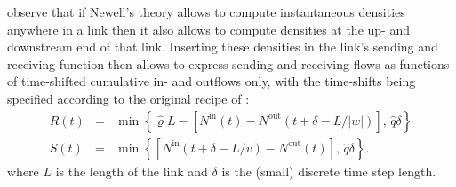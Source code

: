 \citet{yperman-2006,yperman-phd} observe that if Newell's theory
allows to compute instantaneous densities anywhere in a link then
it also allows to compute densities at the up- and downstream end
of that link. Inserting these densities in the link's sending and
receiving function then allows to express sending and receiving flows
as functions of time-shifted cumulative in- and outflows only, with
the time-shifts being specified according to the original recipe of
\citet{newell-1993}:
\begin{eqnarray}
R(t) & = & \min\left\{ \hat{\varrho}L-\left[N^{\text{in}}(t)-N^{\text{out}}(t+\delta-L/|w|)\right],\,\hat{q}\delta\right\} \label{eq:R-yperman}\\
S(t) & = & \min\left\{ \left[N^{\text{in}}(t+\delta-L/v)-N^{\text{out}}(t)\right],\,\hat{q}\delta\right\} .\label{eq:S-yperman}
\end{eqnarray}
where $L$ is the length of the link and $\delta$ is the (small)
discrete time step length.

